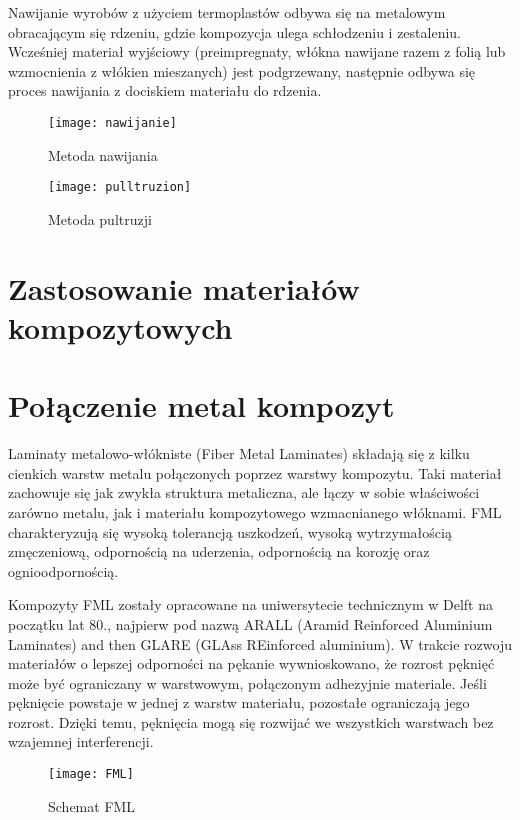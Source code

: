 \documentclass[magister,druk]{dyplom}
\begin{document}
Nawijanie wyrobów z użyciem termoplastów odbywa się na metalowym obracającym się rdzeniu, gdzie kompozycja ulega schłodzeniu i zestaleniu. Wcześniej materiał wyjściowy (preimpregnaty, włókna nawijane razem z folią lub wzmocnienia z włókien mieszanych) jest podgrzewany, następnie odbywa się proces nawijania z dociskiem materiału do rdzenia. 

\begin{figure}[H]
	\texttt{[image: nawijanie]}
	\caption{Metoda nawijania\cite{Chawla1998}}
\end{figure}

\begin{figure}[H]
	\texttt{[image: pulltruzion]}
	\caption{Metoda pultruzji\cite{Chawla1998}}
\end{figure}

\section{Zastosowanie materiałów kompozytowych}
\section{Połączenie metal kompozyt}

Laminaty metalowo-włókniste (Fiber Metal Laminates) składają się z kilku cienkich warstw metalu połączonych poprzez warstwy kompozytu. Taki materiał zachowuje się jak zwykła struktura metaliczna, ale łączy w sobie właściwości zarówno metalu, jak i materiału kompozytowego wzmacnianego włóknami. FML charakteryzują się wysoką tolerancją uszkodzeń, wysoką wytrzymałością zmęczeniową, odpornością na uderzenia, odpornością na korozję oraz ognioodpornością\cite{FML}. 

Kompozyty FML zostały opracowane na uniwersytecie technicznym w Delft na początku lat 80., najpierw pod nazwą ARALL (Aramid Reinforced Aluminium Laminates) and then GLARE (GLAss REinforced aluminium). W trakcie rozwoju materiałów o lepszej odporności na pękanie wywnioskowano, że rozrost pęknięć może być ograniczany w warstwowym, połączonym adhezyjnie materiale. Jeśli pęknięcie powstaje w jednej z warstw materiału, pozostałe ograniczają jego rozrost. Dzięki temu, pęknięcia mogą się rozwijać we wszystkich warstwach bez wzajemnej interferencji. 



\begin{figure}[H]
	\texttt{[image: FML]}
	\centering
	\caption{Schemat FML\cite{FMLold}}
\end{figure}
\end{document}
